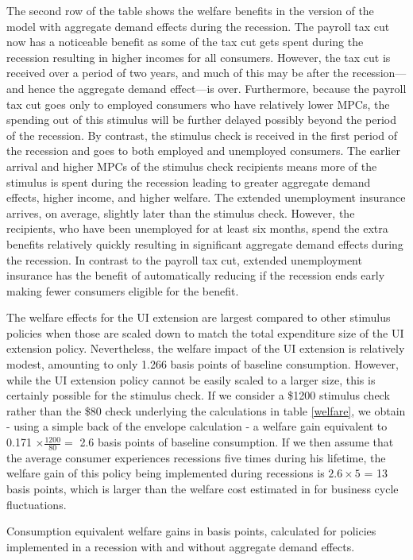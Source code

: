 \documentclass[../HAFiscal]{subfiles}
\begin{document}
The second row of the table shows the welfare benefits in the version of the model with aggregate demand effects during the recession. The payroll tax cut now has a noticeable benefit as some of the tax cut gets spent during the recession resulting in higher incomes for all consumers. However, the tax cut is received over a period of two years, and much of this may be after the recession---and hence the aggregate demand effect---is over. Furthermore, because the payroll tax cut goes only to employed consumers who have relatively lower MPCs, the spending out of this stimulus will be further delayed possibly beyond the period of the recession. By contrast, the stimulus check is received in the first period of the recession and goes to both employed and unemployed consumers. The earlier arrival and higher MPCs of the stimulus check recipients means more of the stimulus is spent during the recession leading to greater aggregate demand effects, higher income, and higher welfare. The extended unemployment insurance arrives, on average, slightly later than the stimulus check. However, the recipients, who have been unemployed for at least six months, spend the extra benefits relatively quickly resulting in significant aggregate demand effects during the recession. In contrast to the payroll tax cut, extended unemployment insurance has the benefit of automatically reducing if the recession ends early making fewer consumers eligible for the benefit.

The welfare effects for the UI extension are largest compared to other stimulus policies when those are scaled down to match the total expenditure size of the UI extension policy. Nevertheless, the welfare impact of the UI extension is relatively modest, amounting to only 1.266 basis points of baseline consumption. However, while the UI extension policy cannot be easily scaled to a larger size, this is certainly possible for the stimulus check. If we consider a \$1200 stimulus check rather than the \$80 check underlying the calculations in table \ref{welfare}, we obtain - using a simple back of the envelope calculation - a welfare gain equivalent to 0.171 $\times \frac{1200}{80} = $ 2.6 basis points of baseline consumption. If we then assume that the average consumer experiences recessions five times during his lifetime, the welfare gain of this policy being implemented during recessions is $2.6\times 5 $ = 13 basis points, which is larger than the welfare cost estimated in \cite{Lucas1987models} for business cycle fluctuations.

\begin{table}[ht] 
	\center
	
	\caption{Consumption equivalent welfare gains in basis points, calculated for policies implemented in a recession with and without aggregate demand effects.}
	\label{welfare}
\end{table}
\end{document}
